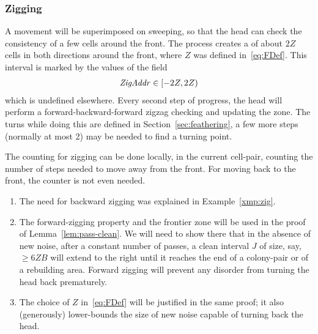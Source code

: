 \documentclass[11pt]{memoir}
\theoremstyle{definition} %
\renewcommand{\ge}{\geq}
\newcommand{\fld}[1]{\ensuremath{\textit{#1\/}}}
\def\B{B}
\newcommand{\Z}{Z} %
\newcommand{\frontDist}{\fld{FrontDist}}
\newcommand{\ZigAddr}{\fld{ZigAddr}}
\begin{document}
\subsubsection{Zigging}\label{sec:zigging}

A  movement will be superimposed on sweeping,
so that the head can check the consistency of a few cells around the front.
The process creates a  of about \( 2\Z \) cells in both directions around the front,
where \( \Z \) was defined in~\eqref{eq:FDef}.
This interval is marked by the values of the field
\begin{align*}
  \ZigAddr\in\lint{-2\Z}{2\Z}
\end{align*}
which is undefined elsewhere.
Every second step of progress, the head will perform a forward-backward-forward
zigzag checking and updating the zone.
The turns while doing this are  defined in Section~\ref{sec:feathering},
a few more steps (normally at most 2) may be needed to find a turning point.

The counting for zigging can be done locally, in the current cell-pair, counting the number
of steps needed to move away from the front.
For moving back to the front, the counter is not even needed.
 
\begin{remarks}\label{rem:zigging-choices}
  \begin{enumerate}
  \item The need for backward zigging was explained in Example~\ref{xmp:zig}.
  \item The forward-zigging property and the frontier zone
    will be used in the proof of Lemma~\ref{lem:pass-clean}.
    We will need to show there that
    in the absence of new noise, after a constant number of passes, a clean interval \( J \)
    of size, say, \( \ge 6\Z\B \) will extend to the right until it reaches
    the end of a colony-pair or of a rebuilding area.
    Forward zigging will prevent any disorder from turning the head back prematurely.
  \item The choice of  \( \Z \) in~\eqref{eq:FDef} will be justified in the same proof; 
    it also (generously) lower-bounds the size of new noise capable of turning back the head.
  \end{enumerate}
\end{remarks}
\end{document}

